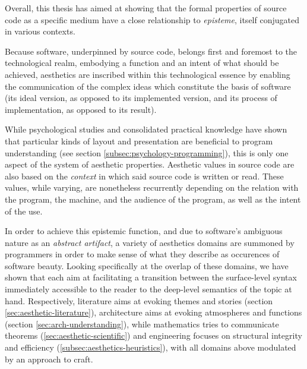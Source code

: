 Overall, this thesis has aimed at showing that the formal properties of source code as a specific medium have a close relationship to \emph{episteme}, itself conjugated in various contexts.

Because software, underpinned by source code, belongs first and foremost to the technological realm, embodying a function and an intent of what should be achieved, aesthetics are inscribed within this technological essence by enabling the communication of the complex ideas which constitute the basis of software (its ideal version, as opposed to its implemented version, and its process of implementation, as opposed to its result).

While psychological studies and consolidated practical knowledge have shown that particular kinds of layout and presentation are beneficial to program understanding (see section \ref{subsec:psychology-programming}), this is only one aspect of the system of aesthetic properties. Aesthetic values in source code are also based on the \emph{context} in which said source code is written or read. These values, while varying, are nonetheless recurrently depending on the relation with the program, the machine, and the audience of the program, as well as the intent of the use.

In order to achieve this epistemic function, and due to software's ambiguous nature as an \emph{abstract artifact}, a variety of aesthetics domains are summoned by programmers in order to make sense of what they describe as occurences of software beauty. Looking specifically at the overlap of these domains, we have shown that each aim at facilitating a transition between the surface-level syntax immediately accessible to the reader to the deep-level semantics of the topic at hand. Respectively, literature aims at evoking themes and stories (section \ref{sec:aesthetic-literature}), architecture aims at evoking atmospheres and functions (section \ref{sec:arch-understanding}), while mathematics tries to communicate theorems (\ref{sec:aesthetic-scientific}) and engineering focuses on structural integrity and efficiency (\ref{subsec:aesthetics-heuristics}), with all domains above modulated by an approach to craft.

